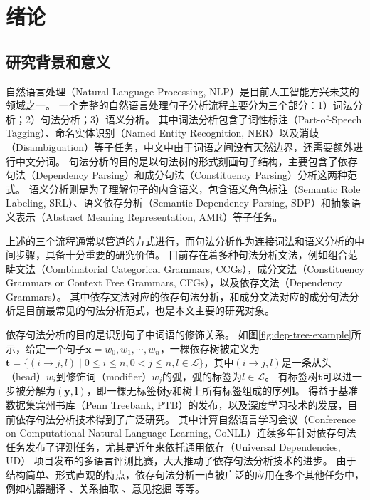 \chapter{绪论}
\label{cha:intro}

\section{研究背景和意义}

自然语言处理（Natural Language Processing, NLP）是目前人工智能方兴未艾的领域之一。
一个完整的自然语言处理句子分析流程主要分为三个部分：1）词法分析；2）句法分析；3）语义分析。
其中词法分析包含了词性标注（Part-of-Speech Tagging）、命名实体识别（Named Entity Recognition, NER）以及消歧（Disambiguation）等子任务，中文中由于词语之间没有天然边界，还需要额外进行中文分词。
句法分析的目的是以句法树的形式刻画句子结构，主要包含了依存句法（Dependency Parsing）和成分句法（Constituency Parsing）分析这两种范式。
语义分析则是为了理解句子的内含语义，包含语义角色标注（Semantic Role Labeling, SRL）、语义依存分析（Semantic Dependency Parsing, SDP）和抽象语义表示（Abstract Meaning Representation, AMR）等子任务。

上述的三个流程通常以管道的方式进行，而句法分析作为连接词法和语义分析的中间步骤，具备十分重要的研究价值。
目前存在着多种句法分析文法，例如组合范畴文法（Combinatorial Categorical Grammars, CCGs），成分文法（Constituency Grammars or Context Free Grammars, CFGs），以及依存文法（Dependency Grammars）。
其中依存文法对应的依存句法分析，和成分文法对应的成分句法分析是目前最常见的句法分析范式，也是本文主要的研究对象。


依存句法分析的目的是识别句子中词语的修饰关系。
如图\ref{fig:dep-tree-example}所示，给定一个句子$\boldsymbol{x}=w_0,w_1,\cdots,w_n$，一棵依存树被定义为$\boldsymbol{t}=\{(i\rightarrow j,l)\mid 0\le i \le n,0 < j \le n,l \in \mathcal{L}\}$，其中$(i\rightarrow j,l)$是一条从头（head）$w_i$到修饰词（modifier）$w_j$的弧，弧的标签为$l \in \mathcal{L}$。
有标签树$\boldsymbol{t}$可以进一步被分解为$(\boldsymbol{y},\boldsymbol{l})$，即一棵无标签树$\boldsymbol{y}$和树上所有标签组成的序列$\boldsymbol{l}$。
得益于基准数据集宾州书库（Penn Treebank, PTB）的发布，以及深度学习技术的发展，目前依存句法分析技术得到了广泛研究。
其中计算自然语言学习会议（Conference on Computational Natural Language Learning, CoNLL）连续多年针对依存句法任务发布了评测任务，尤其是近年来依托通用依存（Universal Dependencies, UD） \citep{nivre-etal-2017-universal}项目发布的多语言评测比赛，大大推动了依存句法分析技术的进步。
由于结构简单、形式直观的特点，依存句法分析一直被广泛的应用在多个其他任务中，例如机器翻译 \citep{zhang-etal-2019-syntax}、关系抽取 \citep{song-etal-2019-leveraging}、意见挖掘 \citep{zhang-etal-2020-syntax}等等。

